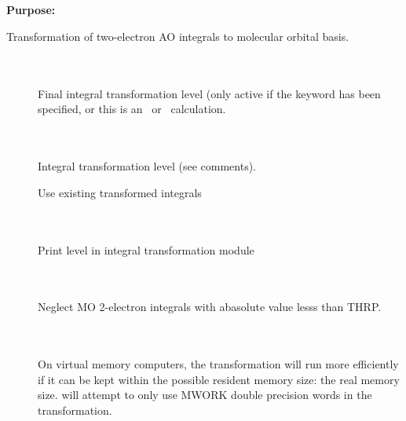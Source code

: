 \pagebreak[3]
\subsection{\label{ref-trainp}}

{\bf Purpose:}

Transformation of two-electron
AO integrals to molecular orbital
basis.

\begin{description}
\item[] \ \\
   \\
  Final integral transformation level (only active if the keyword
   has been specified, or this is an \aba\ or
  \resp\ calculation.

\item[] \ \\
   \\
  Integral transformation level (see comments).

\item[]
  Use existing transformed integrals

\item[] \ \\
   \\
  Print level in integral transformation module

\item[] \ \\
   \\
  Neglect MO 2-electron integrals with abasolute value lesss than THRP.

\item[] \ \\
   \\
  On virtual memory computers, the transformation will run more
  efficiently if it can be kept within the possible resident memory
  size: the real memory size.  {\sir} will attempt to only use MWORK
  double precision words in the transformation.
\end{description}



